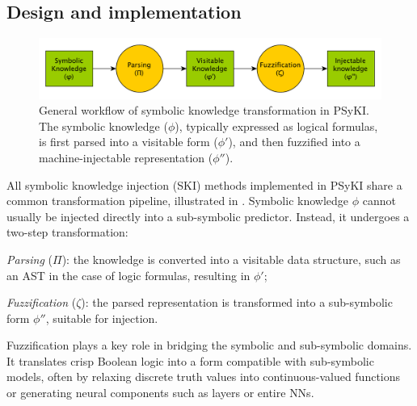 \subsection{Design and implementation}\label{subsec:design-and-implementation}
%
\begin{figure}
    \centering
    \includegraphics[width=\textwidth]{figures/knowledge-workflow-psyki}
    \caption[Symbolic knowledge transformation in PSyKI]{
        General workflow of symbolic knowledge transformation in \Gls{PSyKI}.
        The symbolic knowledge ($\phi$), typically expressed as logical formulas, is first parsed into a visitable form ($\phi'$), and then fuzzified into a machine-injectable representation ($\phi''$).
    }
    \label{fig:knowledge-workflow-psyki}
\end{figure}
%
All symbolic knowledge injection (\gls{SKI}) methods implemented in \gls{PSyKI} share a common transformation pipeline, illustrated in .
%
Symbolic knowledge \(\phi\) cannot usually be injected directly into a sub-symbolic predictor.
%
Instead, it undergoes a two-step transformation:
%
\begin{inlinelist}
    \item \emph{Parsing} (\(\Pi\)): the knowledge is converted into a visitable data structure, such as an \gls{AST} in the case of logic formulas, resulting in \(\phi'\);
    \item \emph{Fuzzification} (\(\zeta\)): the parsed representation is transformed into a sub-symbolic form \(\phi''\), suitable for injection.
\end{inlinelist}
%
Fuzzification plays a key role in bridging the symbolic and sub-symbolic domains.
%
It translates crisp Boolean logic into a form compatible with sub-symbolic models, often by relaxing discrete truth values into continuous-valued functions or generating neural components such as layers or entire \glspl{NN}.

